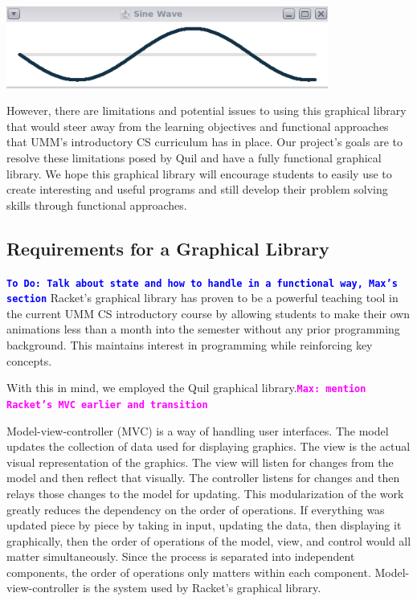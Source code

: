 \documentclass[12pt]{article}
\newcommand{\comment}[1]{{\bf \tt  {#1}}}
\newcommand{\todo}[1]{\textcolor{blue}{\comment{To Do: {#1}}}}
\newcommand{\mmcomment}[1]{\textcolor{magenta}{\comment{Max: {#1}}}}
\begin{document}
\begin{center}
\includegraphics[width=300pt]{sine-wave}
\end{center}

However, there are limitations and potential issues to using this graphical library that would steer away from the learning objectives and functional approaches that UMM's introductory CS curriculum has in place. Our project's goals are to resolve these limitations posed by Quil and have a fully functional graphical library. We hope this graphical library will encourage students to easily use to create interesting and useful programs and still develop their problem solving skills through functional approaches.


\subsection{Requirements for a Graphical Library}\label{subsec:requirements}
\todo{Talk about state and how to handle in a functional way, Max's section}
Racket's graphical library has proven to be a powerful teaching tool in the current UMM CS introductory course by allowing students to make their own animations less than a month into the semester without any prior programming background. This maintains interest in programming while reinforcing key concepts. 

With this in mind, we employed the Quil graphical library.\mmcomment{mention Racket's MVC earlier and transition}

Model-view-controller (MVC) is a way of handling user interfaces. The model updates the collection of data used for displaying graphics. The view is the actual visual representation of the graphics. The view will listen for changes from the model and then reflect that visually. The controller listens for changes and then relays those changes to the model for updating. This modularization of the work greatly reduces the dependency on the order of operations. If everything was updated piece by piece by taking in input, updating the data, then displaying it graphically, then the order of operations of the model, view, and control would all matter simultaneously. Since the process is separated into independent components, the order of operations only matters within each component. Model-view-controller is the system used by Racket's graphical library.
\end{document}
